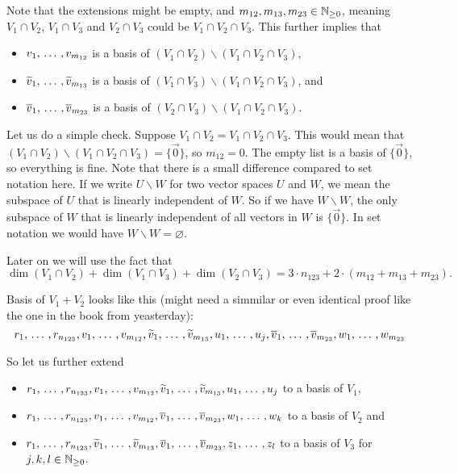 \begin{xrcs}
Note that the extensions might be empty, and $m_{12}, m_{13}, m_{23} \in \mathbb{N}_{\geq 0}$, meaning $V_1 \cap V_2$, $V_1 \cap V_3$ and $V_2 \cap V_3$ could be $V_1 \cap V_2 \cap V_3$. This further implies that
\begin{itemize}
  \item $v_1, {\, \ldots \,\,}, v_{m_{12}}$ is a basis of $(V_1 \cap V_2) \backslash (V_1 \cap V_2 \cap V_3)$,
  \item $\widetilde{v}_1, {\, \ldots \,\,}, \widetilde{v}_{m_{13}}$ is a basis of $(V_1 \cap V_3) \backslash (V_1 \cap V_2 \cap V_3)$, and
  \item $\overline{v}_1, {\, \ldots \,\,}, \overline{v}_{m_{23}}$ is a basis of $(V_2 \cap V_3) \backslash (V_1 \cap V_2 \cap V_3)$.
\end{itemize}
Let us do a simple check. Suppose $V_1 \cap V_2 =  V_1 \cap V_2 \cap V_3$. This would mean that
$(V_1 \cap V_2) \backslash (V_1 \cap V_2 \cap V_3) = \{ \vec 0 \}$, so $m_{12} = 0$. The empty list is a basis of $\{ \vec 0 \}$, so everything is fine. Note that there is a small difference compared to set notation here. If we write $U \backslash W$ for two vector spaces $U$ and $W$, we mean the subspace of $U$ that is linearly independent of $W$. So if we have $W \backslash W$, the only subspace of $W$ that is linearly independent of all vectors in $W$ is $\{ \vec 0 \}$. In set notation we would have $W \backslash W = \varnothing$.


Later on we will use the fact that
\begin{equation}
  \label{eq: fact for dim}
  \dim (V_1 \cap V_2) + \dim (V_1 \cap V_3) + \dim (V_2 \cap V_3) = 3\cdot n_{123} + 2\cdot (m_{12} + m_{13} + m_{23}).
\end{equation}

Basis of $V_1 + V_2$ looks like this (might need a simmilar or even identical proof like the one in the book from yeasterday):
\[ r_1, {\, \ldots \,\,}, r_{n_{123}}, v_1, {\, \ldots \,\,}, v_{m_{12}}, \widetilde{v}_1, {\, \ldots \,\,}, \widetilde{v}_{m_{13}}, u_1, {\, \ldots \,\,}, u_j, \overline{v}_1, {\, \ldots \,\,}, \overline{v}_{m_{23}}, w_1, {\, \ldots \,\,}, w_{m_{23}}
\]


So let us further extend
\begin{itemize}
  \item $r_1, {\, \ldots \,\,}, r_{n_{123}}, v_1, {\, \ldots \,\,}, v_{m_{12}}, \widetilde{v}_1, {\, \ldots \,\,}, \widetilde{v}_{m_{13}}, u_1, {\, \ldots \,\,}, u_j$ to a basis of $V_1$,
  \item $r_1, {\, \ldots \,\,}, r_{n_{123}}, v_1, {\, \ldots \,\,}, v_{m_{12}}, \overline{v}_1, {\, \ldots \,\,}, \overline{v}_{m_{23}}, w_1, {\, \ldots \,\,}, w_k$ to a basis of $V_2$ and
  \item $r_1, {\, \ldots \,\,}, r_{n_{123}}, \widetilde{v}_1, {\, \ldots \,\,}, \widetilde{v}_{m_{13}}, \overline{v}_1, {\, \ldots \,\,}, \overline{v}_{m_{23}}, z_1, {\, \ldots \,\,}, z_l$ to a basis of $V_3$ for $j,k,l \in \mathbb{N}_{\geq 0}$.
\end{itemize}


\end{xrcs}
